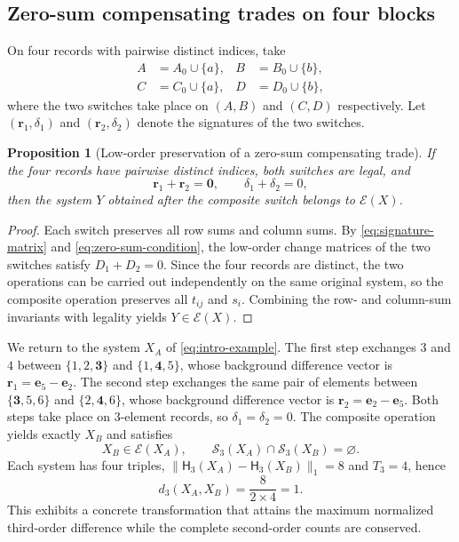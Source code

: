 \documentclass[11pt,a4paper]{article}
\numberwithin{equation}{section}
\newtheorem{proposition}{Proposition}[section]
\theoremstyle{definition}
\numberwithin{algorithm}{section}
\begin{document}
\subsection{Zero-sum compensating trades on four blocks}\label{subsec:variation-trade}

On four records with pairwise distinct indices, take
\begin{equation}
\begin{aligned}
A&=A_0\cup\{a\},&B&=B_0\cup\{b\},\\
C&=C_0\cup\{a\},&D&=D_0\cup\{b\},
\end{aligned}
\label{eq:four-block-trade}
\end{equation}
where the two switches take place on $(A,B)$ and $(C,D)$ respectively.
Let $(\boldsymbol r_1,\delta_1)$ and $(\boldsymbol r_2,\delta_2)$ denote the signatures of
the two switches.

\begin{proposition}[Low-order preservation of a zero-sum compensating trade]
\label{prop:zero-sum-trade}
If the four records have pairwise distinct indices, both switches are legal, and
\begin{equation}
\boldsymbol r_1+\boldsymbol r_2=\boldsymbol0,\qquad
\delta_1+\delta_2=0,
\label{eq:zero-sum-condition}
\end{equation}
then the system $Y$ obtained after the composite switch belongs to $\mathcal E(X)$.
\end{proposition}
\begin{proof}
Each switch preserves all row sums and column sums.
By \eqref{eq:signature-matrix} and \eqref{eq:zero-sum-condition}, the low-order change
matrices of the two switches satisfy $D_1+D_2=0$.
Since the four records are distinct, the two operations can be carried out independently on
the same original system, so the composite operation preserves all $t_{ij}$ and $s_i$.
Combining the row- and column-sum invariants with legality yields $Y\in\mathcal E(X)$.
\end{proof}

We return to the system $X_A$ of \eqref{eq:intro-example}.
The first step exchanges $3$ and $4$ between $\{1,2,\mathbf3\}$ and $\{1,\mathbf4,5\}$,
whose background difference vector is
$\boldsymbol r_1=\boldsymbol e_5-\boldsymbol e_2$.
The second step exchanges the same pair of elements between $\{\mathbf3,5,6\}$ and
$\{2,\mathbf4,6\}$, whose background difference vector is
$\boldsymbol r_2=\boldsymbol e_2-\boldsymbol e_5$.
Both steps take place on $3$-element records, so $\delta_1=\delta_2=0$.
The composite operation yields exactly $X_B$ and satisfies
\begin{equation}
X_B\in\mathcal E(X_A),\qquad
\mathcal S_3(X_A)\cap\mathcal S_3(X_B)=\varnothing.
\label{eq:example-invariant}
\end{equation}
Each system has four triples,
$\|\mathsf H_3(X_A)-\mathsf H_3(X_B)\|_1=8$ and $T_3=4$, hence
\begin{equation}
d_3(X_A,X_B)=\frac{8}{2\times4}=1.
\label{eq:example-distance}
\end{equation}
This exhibits a concrete transformation that attains the maximum normalized third-order
difference while the complete second-order counts are conserved.
\end{document}
